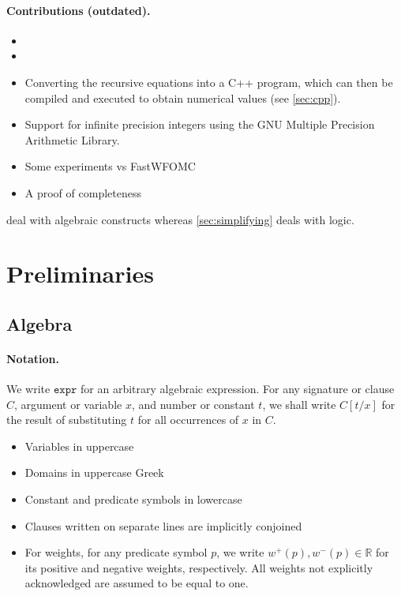 \documentclass{article}
\theoremstyle{definition}
\newcommand{\expr}{\mathtt{expr}}
\begin{document}
\paragraph{Contributions (outdated).}
\begin{itemize}
  \item {}
  \item {}
  \item Converting the recursive equations into a C++ program, which can then be
        compiled and executed to obtain numerical values (see \cref{sec:cpp}).
  \item Support for infinite precision integers using the GNU Multiple Precision
        Arithmetic Library.
  \item Some experiments vs FastWFOMC
  \item A proof of completeness
\end{itemize}

 deal with algebraic constructs whereas
\cref{sec:simplifying} deals with logic.

\section{Preliminaries}

\subsection{Algebra}

\paragraph{Notation.}
We write $\expr{}$ for an arbitrary algebraic expression. For any signature or
clause $C$, argument or variable $x$, and number or constant $t$, we shall write
$C[t / x]$ for the result of substituting $t$ for all occurrences of $x$ in $C$.

\begin{itemize}
  \item Variables in uppercase
  \item Domains in uppercase Greek
  \item Constant and predicate symbols in lowercase
  \item Clauses written on separate lines are implicitly conjoined
  \item For weights, for any predicate symbol $p$, we write
        $w^{+}(p), w^{-}(p) \in \mathbb{R}$ for its positive and negative
        weights, respectively. All weights not explicitly acknowledged are
        assumed to be equal to one.
\end{itemize}
\end{document}
